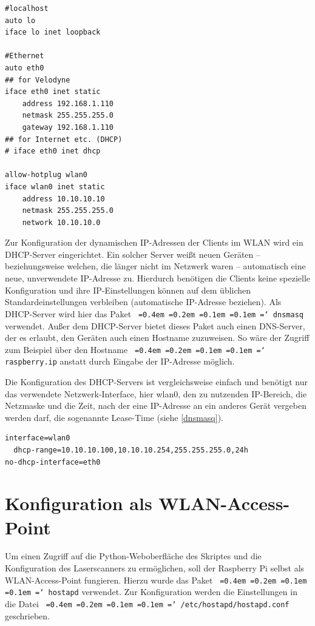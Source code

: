 \documentclass[a4paper,12pt,bibliography=totoc, listof=totoc,titlepage,pointlessnumbers]{scrreprt}
\newcommand*\justify{%
  \fontdimen2\font=0.4em%
  \fontdimen3\font=0.2em%
  \fontdimen4\font=0.1em%
  \fontdimen7\font=0.1em%
  \hyphenchar\font=`\-%
}
\newcommand{\code}[1]{\texttt{\justify{#1}}}
\begin{document}
\begin{lstlisting}[caption={Konfiguration der \code{/etc/network/interfaces}}, label={interfaces}]
#localhost
auto lo
iface lo inet loopback

#Ethernet
auto eth0
## for Velodyne
iface eth0 inet static
	address 192.168.1.110
	netmask 255.255.255.0
	gateway 192.168.1.110
## for Internet etc. (DHCP)
# iface eth0 inet dhcp

allow-hotplug wlan0
iface wlan0 inet static
	address 10.10.10.10
	netmask 255.255.255.0
	network 10.10.10.0
\end{lstlisting}

Zur Konfiguration der dynamischen IP-Adressen der Clients im WLAN wird ein DHCP-Server eingerichtet. Ein solcher Server weißt neuen Geräten -- beziehungsweise welchen, die länger nicht im Netzwerk waren -- automatisch eine neue, unverwendete IP-Adresse zu. Hierdurch benötigen die Clients keine spezielle Konfiguration und ihre IP-Einstellungen können auf dem üblichen Standardeinstellungen verbleiben (automatische IP-Adresse beziehen). Als DHCP-Server wird hier das Paket \code{dnsmasq} verwendet. Außer dem DHCP-Server bietet dieses Paket auch einen DNS-Server, der es erlaubt, den Geräten auch einen Hostname zuzuweisen. So wäre der Zugriff zum Beispiel über den Hostname \code{raspberry.ip} anstatt durch Eingabe der IP-Adresse möglich.

Die Konfiguration des DHCP-Servers ist vergleichsweise einfach und benötigt nur das verwendete Netzwerk-Interface, hier wlan0, den zu nutzenden IP-Bereich, die Netzmaske und die Zeit, nach der eine IP-Adresse an ein anderes Gerät vergeben werden darf, die sogenannte Lease-Time (siehe \autoref{dnsmasq}). \citep{accesspoint}

  
\begin{lstlisting}[caption={Konfiguration der \code{/etc/dnsmasq.conf}}, label={dnsmasq}]
interface=wlan0
  dhcp-range=10.10.10.100,10.10.10.254,255.255.255.0,24h
no-dhcp-interface=eth0
\end{lstlisting}

\section{Konfiguration als WLAN-Access-Point}
Um einen Zugriff auf die Python-Weboberfläche des Skriptes und die Konfiguration des Laser\-scan\-ners zu ermöglichen, soll der Rasp\-berry Pi selbst als WLAN-Access-Point fungieren. Hierzu wurde das Paket \code{hostapd} verwendet. Zur Konfiguration werden die Einstellungen in die Datei \code{/etc/hostapd/hostapd.conf} geschrieben. \citep{accesspoint}
\end{document}
